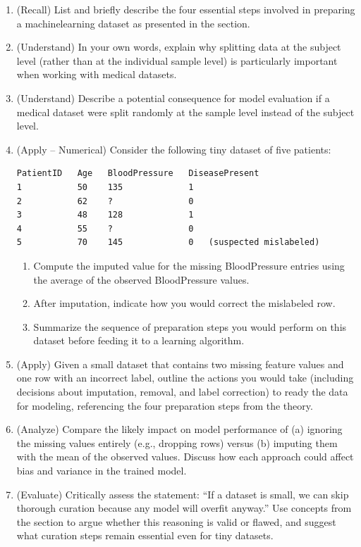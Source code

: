 \documentclass[12pt, a4paper]{article}
\begin{document}
\begin{enumerate}
\item (Recall) List and briefly describe the four essential steps involved in preparing a machinelearning dataset as presented in the section.
\newpage
\item (Understand) In your own words, explain why splitting data at the subject level (rather than at the individual sample level) is particularly important when working with medical datasets.
\newpage
\item (Understand) Describe a potential consequence for model evaluation if a medical dataset were split randomly at the sample level instead of the subject level.
\newpage
\item (Apply -- Numerical) Consider the following tiny dataset of five patients:

\begin{verbatim}
PatientID   Age   BloodPressure   DiseasePresent
1           50    135             1
2           62    ?               0
3           48    128             1
4           55    ?               0
5           70    145             0   (suspected mislabeled)
\end{verbatim}

\begin{enumerate}
\item Compute the imputed value for the missing BloodPressure entries using the average of the observed BloodPressure values.
\item After imputation, indicate how you would correct the mislabeled row.
\item Summarize the sequence of preparation steps you would perform on this dataset before feeding it to a learning algorithm.
\end{enumerate}
\newpage
\item (Apply) Given a small dataset that contains two missing feature values and one row with an incorrect label, outline the actions you would take (including decisions about imputation, removal, and label correction) to ready the data for modeling, referencing the four preparation steps from the theory.
\newpage
\item (Analyze) Compare the likely impact on model performance of (a) ignoring the missing values entirely (e.g., dropping rows) versus (b) imputing them with the mean of the observed values. Discuss how each approach could affect bias and variance in the trained model.
\newpage
\item (Evaluate) Critically assess the statement: ``If a dataset is small, we can skip thorough curation because any model will overfit anyway.'' Use concepts from the section to argue whether this reasoning is valid or flawed, and suggest what curation steps remain essential even for tiny datasets.
\newpage
\end{enumerate}
\end{document}
